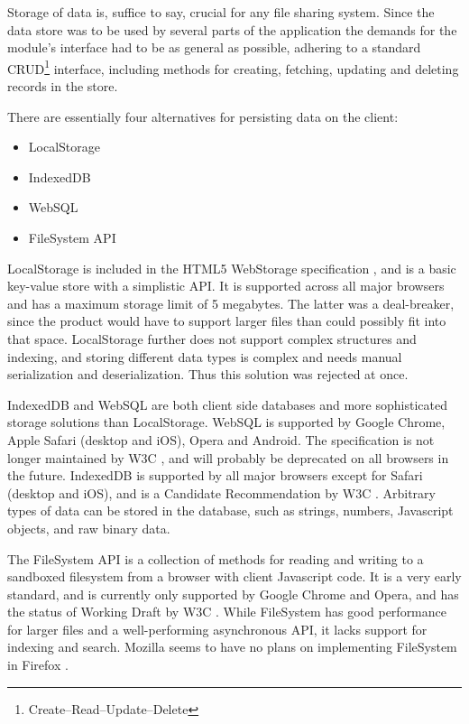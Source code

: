 Storage of data is, suffice to say, crucial for any file sharing system. Since the data store was to be used by several parts of the application the demands for the module's interface had to be as general as possible, adhering to a standard CRUD\footnote{Create–Read–Update–Delete} interface, including methods for creating, fetching, updating and deleting records in the store.

There are essentially four alternatives for persisting data on the client:

\begin{itemize}
\item LocalStorage
\item IndexedDB
\item WebSQL
\item FileSystem API
\end{itemize}

LocalStorage is included in the HTML5 WebStorage specification \cite{WebStorage:Online}, and is a basic key-value store with a simplistic API. It is supported across all major browsers and has a maximum storage limit of 5 megabytes. The latter was a deal-breaker, since the product would have to support larger files than could possibly fit into that space. LocalStorage further does not support complex structures and indexing, and storing different data types is complex and needs manual serialization and deserialization. Thus this solution was rejected at once.

IndexedDB and WebSQL are both client side databases and more sophisticated storage solutions than LocalStorage. WebSQL is supported by Google Chrome, Apple Safari (desktop and iOS), Opera and Android. The specification is not longer maintained by W3C \cite{WebSQL:Online}, and will probably be deprecated on all browsers in the future. IndexedDB is supported by all major browsers except for Safari (desktop and iOS), and is a Candidate Recommendation by W3C \cite{IndexedDB:Online}. Arbitrary types of data can be stored in the database, such as strings, numbers, Javascript objects, and raw binary data.

The FileSystem API is a collection of methods for reading and writing to a sandboxed filesystem from a browser with client Javascript code. It is a very early standard, and is currently only supported by Google Chrome and Opera, and has the status of Working Draft by W3C \cite{FileSystem:Online}. While FileSystem has good performance for larger files and a well-performing asynchronous API, it lacks support for indexing and search. Mozilla seems to have no plans on implementing FileSystem in Firefox \cite{MozillaFileSystem:Online}.

